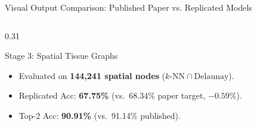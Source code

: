 \documentclass[aspectratio=169, 10pt]{beamer}
\begin{document}
\begin{frame}{Visual Output Comparison: Published Paper vs. Replicated Models}
\begin{columns}[onlytextwidth, t]
\begin{column}{0.31\textwidth}
\begin{block}{Stage 3: Spatial Tissue Graphs}
{        \begin{itemize}\tiny
          \item Evaluated on \textbf{144,241 spatial nodes} ($k\text{-NN} \cap \text{Delaunay}$).
          \item Replicated Acc: \textbf{67.75\%} (vs.\ 68.34\% paper target, $-0.59\%$).
          \item Top-2 Acc: \textbf{90.91\%} (vs.\ 91.14\% published).
        \end{itemize}
      }
    \end{block}
  \end{column}
\end{columns}
\end{frame}

\end{document}
